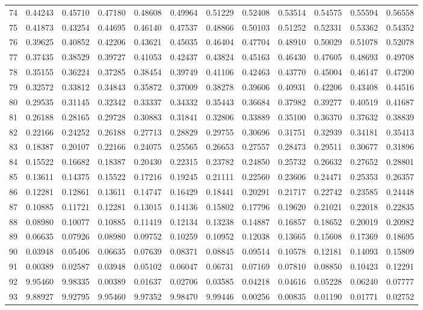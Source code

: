 \begin{center}
\begin{tabular}{|r|rrrrrrrrrrr|}
74&0.44243&0.45710&0.47180&0.48608&0.49964&0.51229&0.52408&0.53514&0.54575&0.55594&0.56558\\[5pt]
75&0.41873&0.43254&0.44695&0.46140&0.47537&0.48866&0.50103&0.51252&0.52331&0.53362&0.54352\\
76&0.39625&0.40852&0.42206&0.43621&0.45035&0.46404&0.47704&0.48910&0.50029&0.51078&0.52078\\
77&0.37435&0.38529&0.39727&0.41053&0.42437&0.43824&0.45163&0.46430&0.47605&0.48693&0.49708\\
78&0.35155&0.36224&0.37285&0.38454&0.39749&0.41106&0.42463&0.43770&0.45004&0.46147&0.47200\\
79&0.32572&0.33812&0.34843&0.35872&0.37009&0.38278&0.39606&0.40931&0.42206&0.43408&0.44516\\[5pt]
80&0.29535&0.31145&0.32342&0.33337&0.34332&0.35443&0.36684&0.37982&0.39277&0.40519&0.41687\\
81&0.26188&0.28165&0.29728&0.30883&0.31841&0.32806&0.33889&0.35100&0.36370&0.37632&0.38839\\
82&0.22166&0.24252&0.26188&0.27713&0.28829&0.29755&0.30696&0.31751&0.32939&0.34181&0.35413\\
83&0.18387&0.20107&0.22166&0.24075&0.25565&0.26653&0.27557&0.28473&0.29511&0.30677&0.31896\\
84&0.15522&0.16682&0.18387&0.20430&0.22315&0.23782&0.24850&0.25732&0.26632&0.27652&0.28801\\[5pt]
85&0.13611&0.14375&0.15522&0.17216&0.19245&0.21111&0.22560&0.23606&0.24471&0.25353&0.26357\\
86&0.12281&0.12861&0.13611&0.14747&0.16429&0.18441&0.20291&0.21717&0.22742&0.23585&0.24448\\
87&0.10885&0.11721&0.12281&0.13015&0.14136&0.15802&0.17796&0.19620&0.21021&0.22018&0.22835\\
88&0.08980&0.10077&0.10885&0.11419&0.12134&0.13238&0.14887&0.16857&0.18652&0.20019&0.20982\\
89&0.06635&0.07926&0.08980&0.09752&0.10259&0.10952&0.12038&0.13665&0.15608&0.17369&0.18695\\[5pt]
90&0.03948&0.05406&0.06635&0.07639&0.08371&0.08845&0.09514&0.10578&0.12181&0.14093&0.15809\\
91&0.00389&0.02587&0.03948&0.05102&0.06047&0.06731&0.07169&0.07810&0.08850&0.10423&0.12291\\
92&9.95460&9.98335&0.00389&0.01637&0.02706&0.03585&0.04218&0.04616&0.05228&0.06240&0.07777\\
93&9.88927&9.92795&9.95460&9.97352&9.98470&9.99446&0.00256&0.00835&0.01190&0.01771&0.02752\\

\end{tabular}
\end{center}
